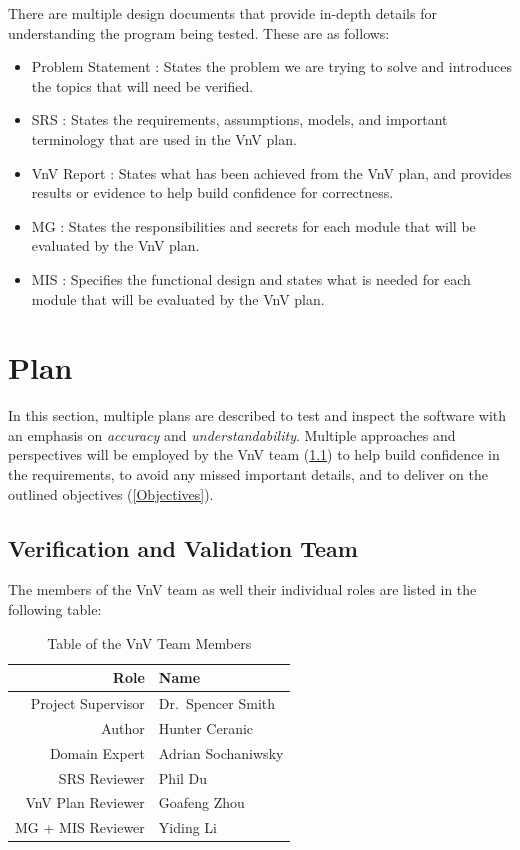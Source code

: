 \documentclass[12pt, titlepage]{article}
\begin{document}
There are multiple design documents that provide in-depth details for understanding
the program being tested. These are as follows:

\begin{itemize}
  \item Problem Statement \citep{Prob_Statement}: States the problem we are trying to solve
    and introduces the topics that will need be verified.
  \item SRS \citep{SRS}: States the requirements, assumptions, models, and important 
  terminology that are used in the VnV plan.
  \item VnV Report \citep{VnV_report}: States what has been achieved from the VnV plan,
    and provides results or evidence to help build confidence for correctness.
  \item MG \citep{MG}: States the responsibilities and secrets for each module that will
    be evaluated by the VnV plan.
  \item MIS \citep{MIS}: Specifies the functional design and states what is needed for each
    module that will be evaluated by the VnV plan.
\end{itemize}

\section{Plan}

In this section, multiple plans are described to test and inspect the software with an emphasis 
on \textit{accuracy} and \textit{understandability}. Multiple approaches and perspectives will be employed by the VnV team (\ref{Team})
to help build confidence in the requirements, to avoid any missed important details, 
and to deliver on the outlined objectives (\ref{Objectives}).

\subsection{Verification and Validation Team} \label{Team}

The members of the VnV team as well their individual roles are listed in the following table:

\begin{table}[h!]
  \centering
  \begin{tabular}{|r|l|}
    \hline
    \textbf{Role} & \textbf{Name} \\ \hline
    Project Supervisor & Dr.\ Spencer Smith  \\ \hline
    Author             & Hunter Ceranic      \\ \hline
    Domain Expert      & Adrian Sochaniwsky  \\ \hline
    SRS Reviewer       & Phil Du             \\ \hline
    VnV Plan Reviewer  & Goafeng Zhou        \\ \hline
    MG + MIS Reviewer  & Yiding Li           \\ \hline
  \end{tabular}
  \caption{Table of the VnV Team Members}
  \label{table_vnv_team}
\end{table}
\end{document}
